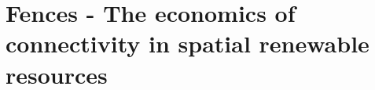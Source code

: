 \chapter{Fences - The economics of connectivity in spatial renewable resources}



\begin{minipage}{0.9\textwidth}
\singlespace

\end{minipage}
